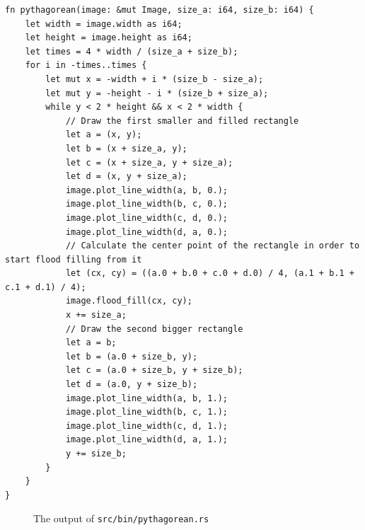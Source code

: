 \documentclass[12pt,openany,a4,usenames,dvipsnames]{book}
\DeclareRobustCommand{\Caption}[1]{\par%
  \vspace{1em}
  {\noindent{}#1}}
\begin{document}
\begin{verbatim}
fn pythagorean(image: &mut Image, size_a: i64, size_b: i64) {
    let width = image.width as i64;
    let height = image.height as i64;
    let times = 4 * width / (size_a + size_b);
    for i in -times..times {
        let mut x = -width + i * (size_b - size_a);
        let mut y = -height - i * (size_b + size_a);
        while y < 2 * height && x < 2 * width {
            // Draw the first smaller and filled rectangle
            let a = (x, y);
            let b = (x + size_a, y);
            let c = (x + size_a, y + size_a);
            let d = (x, y + size_a);
            image.plot_line_width(a, b, 0.);
            image.plot_line_width(b, c, 0.);
            image.plot_line_width(c, d, 0.);
            image.plot_line_width(d, a, 0.);
            // Calculate the center point of the rectangle in order to start flood filling from it
            let (cx, cy) = ((a.0 + b.0 + c.0 + d.0) / 4, (a.1 + b.1 + c.1 + d.1) / 4);
            image.flood_fill(cx, cy);
            x += size_a;
            // Draw the second bigger rectangle
            let a = b;
            let b = (a.0 + size_b, y);
            let c = (a.0 + size_b, y + size_b);
            let d = (a.0, y + size_b);
            image.plot_line_width(a, b, 1.);
            image.plot_line_width(b, c, 1.);
            image.plot_line_width(c, d, 1.);
            image.plot_line_width(d, a, 1.);
            y += size_b;
        }
    }
}
\end{verbatim}
\begin{figure}[H]
  \centering
  \Caption{The output of \texttt{src/bin/pythagorean.rs}}
\end{figure}
\clearpage{}
\end{document}
